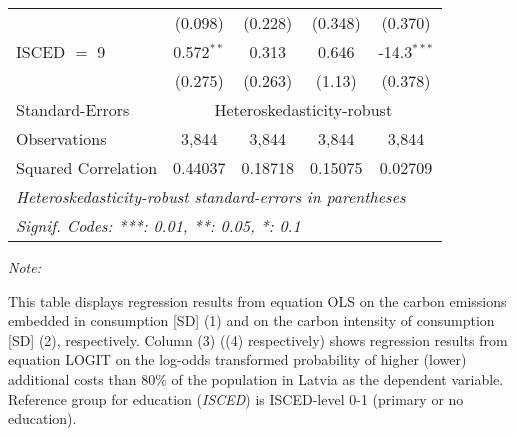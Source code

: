\begin{table}[htbp!]
\begin{adjustbox}{width = 1\textwidth, max height = 0.95\textheight, center}
\begin{threeparttable}[b]
\begin{tabular}{lcccc}
                                 & (0.098)            & (0.228)            & (0.348)        & (0.370)\\   
            ISCED $=$ 9          & 0.572$^{**}$       & 0.313              & 0.646          & -14.3$^{***}$\\   
                                 & (0.275)            & (0.263)            & (1.13)         & (0.378)\\   
            \midrule 
            Standard-Errors & \multicolumn{4}{c}{Heteroskedasticity-robust} \\ 
            Observations         & 3,844              & 3,844              & 3,844          & 3,844\\  
            Squared Correlation  & 0.44037            & 0.18718            & 0.15075        & 0.02709\\  
            \midrule \midrule
            \multicolumn{5}{l}{\emph{Heteroskedasticity-robust standard-errors in parentheses}}\\
            \multicolumn{5}{l}{\emph{Signif. Codes: ***: 0.01, **: 0.05, *: 0.1}}\\
         \end{tabular}
         
         \begin{tablenotes}\item \medskip \textit{Note:}
            \item This table displays regression results from equation OLS on the carbon emissions embedded in consumption [SD] (1) and on the carbon intensity of consumption [SD] (2), respectively. 
                                      Column (3) ((4) respectively) shows regression results from equation LOGIT on the log-odds transformed probability of higher (lower) additional costs than 80\% of the population in Latvia as the dependent variable. Reference group for education (\textit{ISCED}) is ISCED-level 0-1 (primary or no education).
         \end{tablenotes}
      \end{threeparttable}
   \end{adjustbox}
\end{table}



